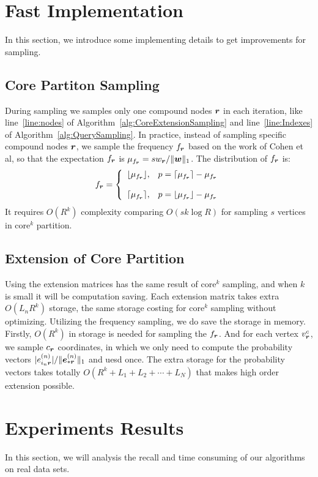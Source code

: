 \documentclass[letterpaper]{article}
\newcommand{\Sca}[3]{{#1}^{(#2)}_{i_#2#3}}%
\newcommand{\enr}[2]{\Sca{e}{#1}{\V{#2}}}
\newcommand{\V}[1]{{\boldsymbol{{\MakeLowercase{#1}}}}}
\newcommand{\ColVec}[3]{\V{#1}^{(#2)}_{#3}}
\newcommand{\NormColE}[2]{\norm{\ColVec{e}{#1}{*\V{#2}}}{1}}
\newcommand{\norm}[2]{\|#1\|_{#2}}
\newcommand{\AlgLine}[2]{line~\ref{line:#2} of Algorithm~\ref{alg:#1}}
\begin{document}
\section{Fast Implementation}
In this section, we introduce some implementing details to get improvements for sampling.
\subsection{Core Partiton Sampling}
During sampling we samples only one compound nodes $\V{r}$ in each iteration,
like \AlgLine{CoreExtensionSampling}{nodes} and \AlgLine{QuerySampling}{Indexes}.
In practice, instead of sampling specific compound nodes $\V{r}$, 
we sample the frequency $f_\V{r}$ based on the work of Cohen et al,
so that the expectation $f_\V{r}$ is $\mu_{f_\V{r}}=sw_\V{r}/\norm{\V{w}}{1}$.
The distribution of $f_\V{r}$ is:
\begin{equation*}f_\V{r}=
    \left\{
      \begin{array}{ll}
        \lfloor \mu_{f_\V{r}} \rfloor,
        & \hbox{$p=\lceil \mu_{f_\V{r}} \rceil - \mu_{f_\V{r}}$} \\\\
        \lceil \mu_{f_\V{r}} \rceil,
        & \hbox{$p=\lfloor \mu_{f_\V{r}} \rfloor - \mu_{f_\V{r}}$}
      \end{array}
    \right.
\end{equation*}
It requires $O(R^k)$ complexity comparing $O(sk\log{R})$
for sampling $s$ vertices in core$^k$ partition.
\subsection{Extension of Core Partition}
Using the extension matrices has the same result of core$^k$ sampling,
and when $k$ is small it will be computation saving.
Each extension matrix takes extra $O(L_nR^k)$ storage,
the same storage costing for core$^k$ sampling without optimizing.
Utilizing the frequency sampling, we do save the storage in memory.
Firstly, $O(R^k)$ in storage is needed for sampling the $f_\V{r}$.
And for each vertex $v^c_{\V{r}}$,
we sample $c_{\V{r}}$ coordinates,
in which we only need to compute the probability vectors
$|\enr{n}{r}|/\NormColE{n}{r}$ and uesd once.
The extra storage for the probability vectors takes totally
$O(R^k + L_1 + L_2 + \cdots + L_N)$
that makes high order extension possible.
\section{Experiments Results}
In this section, we will analysis the recall
and time consuming of our algorithms on real data sets.
\end{document}
